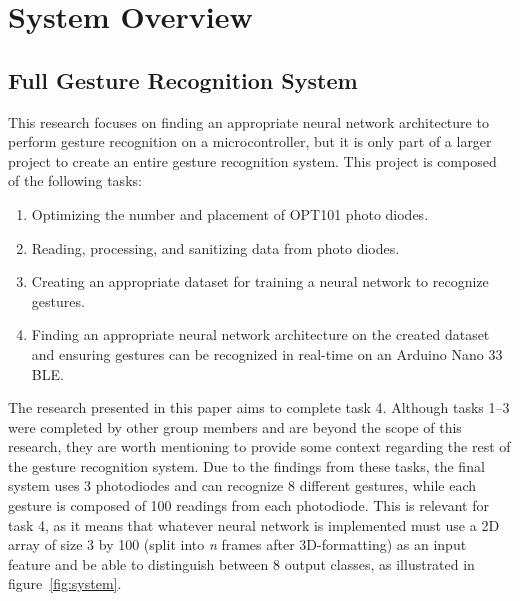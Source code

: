 \section{System Overview}\label{sec:system-overview}
\subsection{Full Gesture Recognition System}\label{subsec:full-gesture-recognition-system}
This research focuses on finding an appropriate neural network architecture to perform gesture recognition on a microcontroller, but it is only part of a larger project to create an entire gesture recognition system.
This project is composed of the following tasks:
\begin{enumerate}
    \item Optimizing the number and placement of OPT101 photo diodes.
    \item Reading, processing, and sanitizing data from photo diodes.
    \item Creating an appropriate dataset for training a neural network to recognize gestures.
    \item Finding an appropriate neural network architecture on the created dataset and ensuring gestures can be recognized in real-time on an Arduino Nano 33 BLE\@.
\end{enumerate}

The research presented in this paper aims to complete task 4.
Although tasks 1--3 were completed by other group members and are beyond the scope of this research, they are worth mentioning to provide some context regarding the rest of the gesture recognition system.
Due to the findings from these tasks, the final system uses 3 photodiodes and can recognize 8 different gestures, while each gesture is composed of 100 readings from each photodiode.
This is relevant for task 4, as it means that whatever neural network is implemented must use a 2D array of size 3 by 100 (split into \textit{n} frames after 3D-formatting) as an input feature and be able to distinguish between 8 output classes, as illustrated in figure~\ref{fig:system}.

